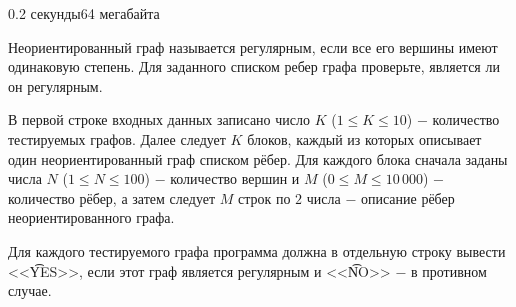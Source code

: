 \begin{problem}{}{}{}{0.2 секунды}{64 мегабайта}

Неориентированный граф называется регулярным, если все его вершины имеют одинаковую степень. 
Для заданного списком ребер графа проверьте, является ли он регулярным.

\InputFile
В первой строке входных данных записано число $K$ ($1 \le K \le 10$) $-$ количество тестируемых графов. 
Далее следует $K$ блоков, каждый из которых описывает один неориентированный граф списком рёбер. 
Для каждого блока сначала заданы числа $N$ ($1 \le N \le 100$) $-$ количество вершин и $M$ ($0 \le M \le 10\,000$) $-$
количество рёбер, а затем следует $M$ строк по $2$ числа $-$ описание рёбер неориентированного графа.

\OutputFile
Для каждого тестируемого графа программа должна в отдельную строку вывести <<{\t{YES}}>>, если этот граф
является регулярным и <<{\t{NO}}>> $-$ в противном случае.

\Example

\begin{example}
%
\end{example}

\end{problem}

